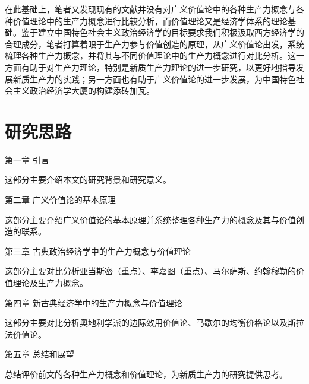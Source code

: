 在此基础上，笔者又发现现有的文献并没有对广义价值论中的各种生产力概念与各种价值理论中的生产力概念进行比较分析，而价值理论又是经济学体系的理论基础\cite[118]{CaiJiMingCongGuDianZhengZhiJingJiXueDaoZhongGuoTeSeSheHuiZhuYiZhengZhiJingJiXueJiYuZhongGuoShiJiaoDeZhengZhiJingJiXueYanBianShangCe2023}。鉴于建立中国特色社会主义政治经济学的目标要求我们积极汲取西方经济学的合理成分\cite[81]{ChengEnFuChongJianZhongGuoJingJiXueChaoYueMaKeSiYuXiFangJingJiXue2000}，笔者打算着眼于生产力参与价值创造的原理，从广义价值论出发，系统梳理各种生产力概念，并将其与不同价值理论中的生产力概念进行对比分析。这一方面有助于对生产力理论，特别是新质生产力理论的进一步研究，以更好地指导发展新质生产力的实践；另一方面也有助于广义价值论的进一步发展，为中国特色社会主义政治经济学大厦的构建添砖加瓦。


\section{研究思路}

第一章 \quad 引言

这部分主要介绍本文的研究背景和研究意义。

第二章 \quad 广义价值论的基本原理

这部分主要介绍广义价值论的基本原理并系统整理各种生产力的概念及其与价值创造的联系。

第三章 \quad 古典政治经济学中的生产力概念与价值理论

这部分主要对比分析亚当斯密（重点）、李嘉图（重点）、马尔萨斯、约翰穆勒的价值理论及生产力概念。

第四章 \quad 新古典经济学中的生产力概念与价值理论

这部分主要对比分析奥地利学派的边际效用价值论、马歇尔的均衡价格论以及斯拉法价值论。

第五章 \quad 总结和展望

总结评价前文的各种生产力概念和价值理论，为新质生产力的研究提供思考。

